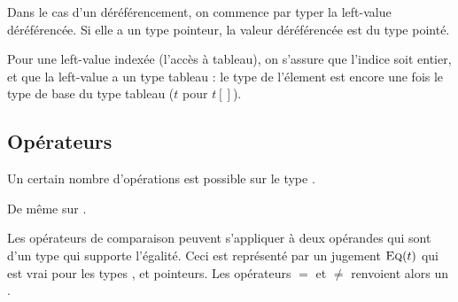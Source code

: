 \begin{mathpar}
\end{mathpar}

Dans le cas d'un déréférencement, on commence par typer la left-value
déréférencée. Si elle a un type pointeur, la valeur déréférencée est du type
pointé.

\begin{mathpar}
\end{mathpar}

Pour une left-value indexée (l'accès à tableau), on s'assure que l'indice soit
entier, et que la left-value a un type tableau : le type de l'élement est encore
une fois le type de base du type tableau ($t$ pour $t[]$).

\begin{mathpar}
\end{mathpar}

\begin{mathpar}
\end{mathpar}


\subsection*{Opérateurs}

Un certain nombre d'opérations est possible sur le type \tInt.

\begin{mathpar}
\end{mathpar}

De même sur \tFloat.

\begin{mathpar}
\end{mathpar}

Les opérateurs de comparaison peuvent s'appliquer à deux opérandes qui sont d'un
type qui supporte l'égalité. Ceci est représenté par un jugement
$\textsc{Eq}(t)$ qui est vrai pour les types \tInt, \tFloat et pointeurs. Les
opérateurs $=$ et $≠$ renvoient alors un \tInt.

\begin{mathpar}



\end{mathpar}


